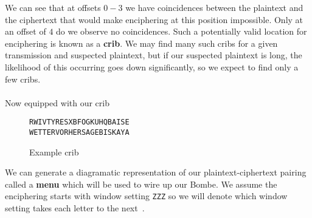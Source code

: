 We can see that at offsets $0-3$ we have coincidences between the
plaintext and the ciphertext that would make enciphering at this
position impossible. Only at an offset of $4$ do we observe no
coincidences. Such a potentially valid location for enciphering is
known as a {\bf{crib}}. We may find many such cribs for a given
transmission and suspected plaintext, but if our suspected plaintext
is long, the likelihood of this occurring goes down significantly, so
we expect to find only a few cribs.
\\\\Now equipped with our crib
\begin{figure}[H]
  \begin{center}
    \texttt{RWIVTYRESXBFOGKUHQBAISE}  \\
    \texttt{WETTERVORHERSAGEBISKAYA} \\
  \end{center}
  \caption{Example crib}
  \label{fig:crib}
\end{figure}
\noindent We can generate a diagramatic representation of our
plaintext-ciphertext pairing called a {\bf{menu}} which will be used
to wire up our Bombe. We assume the enciphering starts with window
setting \texttt{ZZZ} so we will denote which window setting takes
each letter to the next~\cite[p.~306]{Welchman1982HutSix}.
